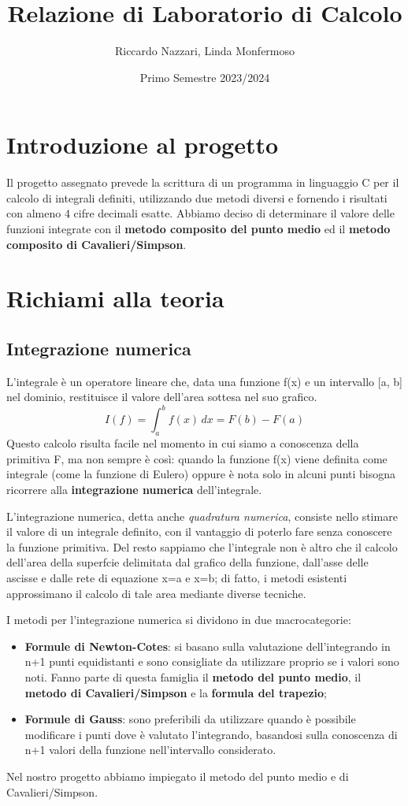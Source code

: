 \documentclass{article}
\title{Relazione di Laboratorio di Calcolo}
\author{Riccardo Nazzari, Linda Monfermoso}
\date{Primo Semestre 2023/2024}
\begin{document}
\maketitle

\section{Introduzione al progetto}
Il progetto assegnato prevede la scrittura di un programma in linguaggio C per il calcolo di integrali definiti,
utilizzando due metodi diversi e fornendo i risultati con almeno 4 cifre decimali esatte. Abbiamo deciso di determinare
il valore delle funzioni integrate con il \textbf{metodo composito del punto medio} ed il \textbf{metodo composito di Cavalieri/Simpson}.

\section{Richiami alla teoria}
\subsection{Integrazione numerica}
L'integrale è un operatore lineare che, data una funzione f(x) e un intervallo [a, b] nel dominio, restituisce il valore 
dell'area sottesa nel suo grafico. 
\begin{equation*}
   I(f) =  \int_{a}^{b} f(x)\, dx = F(b) - F(a)
\end{equation*}
Questo calcolo risulta facile nel momento in cui siamo a conoscenza della primitiva F, ma non sempre è così: quando la funzione
f(x) viene definita come integrale (come la funzione di Eulero) oppure è nota solo in alcuni punti bisogna ricorrere alla
\textbf{integrazione numerica} dell'integrale.

L'integrazione numerica, detta anche \textit{quadratura numerica}, consiste nello stimare il valore di un integrale definito, 
con il vantaggio di poterlo fare senza conoscere la funzione primitiva. Del resto sappiamo che l'integrale non è altro che il calcolo 
dell'area della superfcie delimitata dal grafico della funzione, dall'asse delle ascisse e dalle rete di equazione x=a e x=b; di fatto, i 
metodi esistenti approssimano il calcolo di tale area mediante diverse tecniche.

I metodi per l'integrazione numerica si dividono in due macrocategorie:
\begin{itemize}
   \item \textbf{Formule di Newton-Cotes}: si basano sulla valutazione dell'integrando in n+1 punti equidistanti e sono consigliate da utilizzare proprio se i 
   valori sono noti. Fanno parte di questa famiglia il \textbf{metodo del punto medio}, il \textbf{metodo di Cavalieri/Simpson} e la \textbf{formula del trapezio};
   \item \textbf{Formule di Gauss}: sono preferibili da utilizzare quando è possibile modificare i punti dove è valutato l'integrando, basandosi 
   sulla conoscenza di n+1 valori della funzione nell'intervallo considerato.
\end{itemize}
Nel nostro progetto abbiamo impiegato il metodo del punto medio e di Cavalieri/Simpson.
\end{document}
